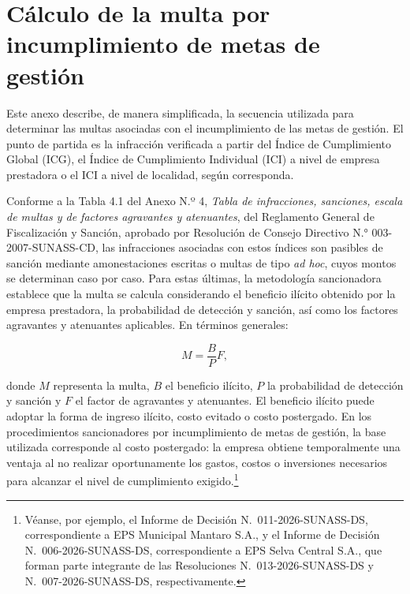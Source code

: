 \section{Cálculo de la multa por incumplimiento de metas de gestión}
\label{app:calculo_sancionador}

Este anexo describe, de manera simplificada, la secuencia utilizada para determinar las multas asociadas con el incumplimiento de las metas de gestión. El punto de partida es la infracción verificada a partir del Índice de Cumplimiento Global (ICG), el Índice de Cumplimiento Individual (ICI) a nivel de empresa prestadora o el ICI a nivel de localidad, según corresponda.

Conforme a la Tabla 4.1 del Anexo N.º 4, \textit{Tabla de infracciones, sanciones, escala de multas y de factores agravantes y atenuantes}, del Reglamento General de Fiscalización y Sanción, aprobado por Resolución de Consejo Directivo N.° 003-2007-SUNASS-CD, las infracciones asociadas con estos índices son pasibles de sanción mediante amonestaciones escritas o multas de tipo \textit{ad hoc}, cuyos montos se determinan caso por caso. Para estas últimas, la metodología sancionadora establece que la multa se calcula considerando el beneficio ilícito obtenido por la empresa prestadora, la probabilidad de detección y sanción, así como los factores agravantes y atenuantes aplicables. En términos generales:

\begin{equation}
\label{eq:anexo_formula_general_multa}
M
=
\frac{B}{P}
F,
\end{equation}

donde \(M\) representa la multa, \(B\) el beneficio ilícito, \(P\) la probabilidad de detección y sanción y \(F\) el factor de agravantes y atenuantes. El beneficio ilícito puede adoptar la forma de ingreso ilícito, costo evitado o costo postergado. En los procedimientos sancionadores por incumplimiento de metas de gestión, la base utilizada corresponde al costo postergado: la empresa obtiene temporalmente una ventaja al no realizar oportunamente los gastos, costos o inversiones necesarios para alcanzar el nivel de cumplimiento exigido.\footnote{Véanse, por ejemplo, el Informe de Decisión N.\textdegree~011-2026-SUNASS-DS, correspondiente a EPS Municipal Mantaro S.A., y el Informe de Decisión N.\textdegree~006-2026-SUNASS-DS, correspondiente a EPS Selva Central S.A., que forman parte integrante de las Resoluciones N.\textdegree~013-2026-SUNASS-DS y N.\textdegree~007-2026-SUNASS-DS, respectivamente.}

